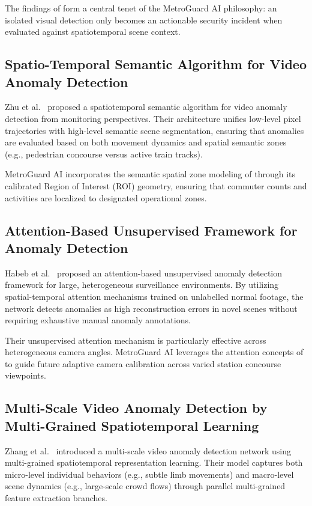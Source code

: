 \documentclass[12pt,a4paper]{report}
\begin{document}
The findings of \cite{p9} form a central tenet of the MetroGuard AI philosophy: an isolated visual detection only becomes an actionable security incident when evaluated against spatiotemporal scene context.

\subsection{Spatio-Temporal Semantic Algorithm for Video Anomaly Detection}
Zhu et al.\ \cite{p10} proposed a spatiotemporal semantic algorithm for video anomaly detection from monitoring perspectives. Their architecture unifies low-level pixel trajectories with high-level semantic scene segmentation, ensuring that anomalies are evaluated based on both movement dynamics and spatial semantic zones (e.g., pedestrian concourse versus active train tracks).

MetroGuard AI incorporates the semantic spatial zone modeling of \cite{p10} through its calibrated Region of Interest (ROI) geometry, ensuring that commuter counts and activities are localized to designated operational zones.

\subsection{Attention-Based Unsupervised Framework for Anomaly Detection}
Habeb et al.\ \cite{p15} proposed an attention-based unsupervised anomaly detection framework for large, heterogeneous surveillance environments. By utilizing spatial-temporal attention mechanisms trained on unlabelled normal footage, the network detects anomalies as high reconstruction errors in novel scenes without requiring exhaustive manual anomaly annotations.

Their unsupervised attention mechanism is particularly effective across heterogeneous camera angles. MetroGuard AI leverages the attention concepts of \cite{p15} to guide future adaptive camera calibration across varied station concourse viewpoints.

\subsection{Multi-Scale Video Anomaly Detection by Multi-Grained Spatiotemporal Learning}
Zhang et al.\ \cite{p17} introduced a multi-scale video anomaly detection network using multi-grained spatiotemporal representation learning. Their model captures both micro-level individual behaviors (e.g., subtle limb movements) and macro-level scene dynamics (e.g., large-scale crowd flows) through parallel multi-grained feature extraction branches.
\end{document}
